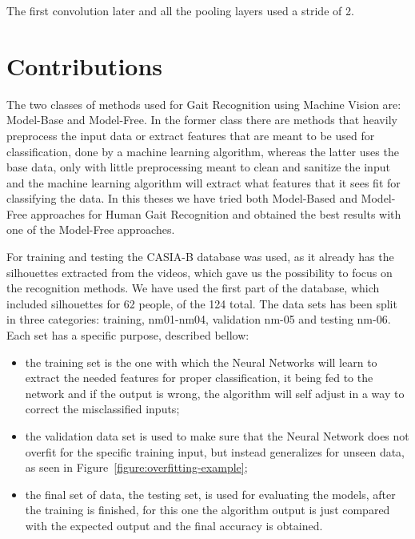 \documentclass[12pt]{article}
\theoremstyle{definition}
\begin{document}
	The first convolution later and all the pooling layers used a stride of 2.

	\clearpage

	\section{Contributions}
	\vspace{1cm}

	The two classes of methods used for Gait Recognition using Machine Vision are: Model-Base and Model-Free. In the former class there are methods that heavily preprocess the input data or extract features that are meant to be used for classification, done by a machine learning algorithm, whereas the latter uses the base data, only with little preprocessing meant to clean and sanitize the input and the machine learning algorithm will extract what features that it sees fit for classifying the data. In this theses we have tried both Model-Based and Model-Free approaches for Human Gait Recognition and obtained the best results with one of the Model-Free approaches.

	For training and testing the CASIA-B database \cite{casia1}\cite{casia2}\cite{casia3} was used, as it already has the silhouettes extracted from the videos, which gave us the possibility to focus on the recognition methods. We have used the first part of the database, which included silhouettes for 62 people, of the 124 total. The data sets has been split in three categories: training, nm01-nm04, validation nm-05 and testing nm-06. Each set has a specific purpose, described bellow:
	\begin{itemize}
		\item the training set is the one with which the Neural Networks will learn to extract the needed features for proper classification, it being fed to the network and if the output is wrong, the algorithm will self adjust in a way to correct the misclassified inputs;
		\item the validation data set is used to make sure that the Neural Network does not overfit for the specific training input, but instead generalizes for unseen data, as seen in Figure~\ref{figure:overfitting-example};
		\item the final set of data, the testing set, is used for evaluating the models, after the training is finished, for this one the algorithm output is just compared with the expected output and the final accuracy is obtained.
	\end{itemize}
\end{document}
